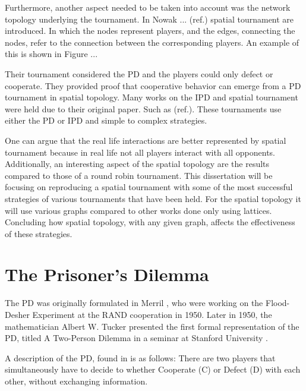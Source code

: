 Furthermore, another aspect needed to be taken into account was the network
topology underlying the tournament. In Nowak ...  (ref.)
spatial tournament are introduced. In which the nodes represent players, and the
edges, connecting the nodes, refer to the connection between the corresponding
players. An example of this is shown in Figure ...


Their tournament considered the PD and the players could only defect or
cooperate.  They provided proof that cooperative behavior can emerge from a PD
tournament in spatial topology. Many works on the IPD and spatial tournament
were held due to their original paper. Such as (ref.).  These tournaments use
either the PD or IPD and simple to complex strategies.

One can argue that the real life interactions are better represented by spatial
tournament because in real life not all players interact with all opponents.
Additionally, an interesting aspect of the spatial topology are the results
compared to those of a round robin tournament. This dissertation will be focusing on
reproducing a spatial tournament with some of the most successful strategies of
various tournaments that have been held. For the spatial topology it will use
various graphs compared to other works done only using lattices. Concluding how
spatial topology, with any given graph, affects the effectiveness of these
strategies.

\section{The Prisoner's Dilemma}

The PD was originally formulated in Merril \cite{M. Flood and Melvin Dresher},
who were working on the Flood-Desher Experiment at the RAND cooperation in 1950.
Later in 1950, the mathematician Albert W. Tucker presented the first formal
representation of the PD, titled  A Two-Person Dilemma in a seminar at
Stanford University \parencite{Gass005}.

A description of the PD, found in \parencite{Li2011} is as follows:
There are two players that simultaneously have to decide to whether Cooperate (C)
or Defect (D) with each other, without exchanging information.

